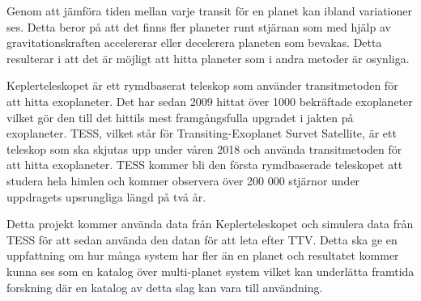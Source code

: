 \documentclass[12pt]{report}
\begin{document}
	Genom att jämföra tiden mellan varje transit för en planet kan ibland variationer ses. Detta beror på att det finns fler planeter runt stjärnan som med hjälp av gravitationskraften accelererar eller decelerera planeten som bevakas. Detta resulterar i att det är möjligt att hitta planeter som i andra metoder är osynliga. 
	
	Keplerteleskopet är ett rymdbaserat teleskop som använder transitmetoden för att hitta exoplaneter. Det har sedan 2009 hittat över 1000 bekräftade exoplaneter vilket gör den till det hittils mest framgångsfulla upgradet i jakten på exoplaneter. TESS, vilket står för Transiting-Exoplanet Survet Satellite, är ett teleskop som ska skjutas upp under våren 2018 och använda transitmetoden för att hitta exoplaneter. TESS kommer bli den första rymdbaserade teleskopet att studera hela himlen och kommer observera över 200 000 stjärnor under uppdragets upsrungliga längd på två år.
	
	Detta projekt kommer använda data från Keplerteleskopet och simulera data från TESS för att sedan använda den datan för att leta efter TTV. Detta ska ge en uppfattning om hur många system har fler än en planet och resultatet kommer kunna ses som en katalog över multi-planet system vilket kan underlätta framtida forskning där en katalog av detta slag kan vara till användning.
	
	



\newpage

\thispagestyle{empty}
\mbox{} %

\newpage

\setcounter{page}{1} %

\tableofcontents

\newpage

\listoffigures 
\listoftables

\newpage
\end{document}
